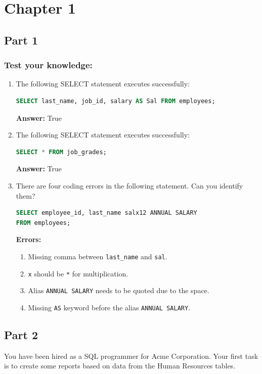 \documentclass[a4paper,12pt]{article}
\begin{document}


\newpage
\section*{Chapter 1}
\subsection*{Part 1}
\subsubsection*{Test your knowledge:}

\begin{enumerate}
    \item The following SELECT statement executes successfully: 
    \begin{lstlisting}[language=SQL]
SELECT last_name, job_id, salary AS Sal FROM employees;
    \end{lstlisting}
    \textbf{Answer:} True

    \item The following SELECT statement executes successfully:
    \begin{lstlisting}[language=SQL]
SELECT * FROM job_grades;
    \end{lstlisting}
    \textbf{Answer: }True
    
    \item There are four coding errors in the following statement. Can you identify them? 
    \begin{lstlisting}[language=SQL]
SELECT employee_id, last_name salx12 ANNUAL SALARY 
FROM employees;
    \end{lstlisting}
    \textbf{Errors:}
    \begin{enumerate}
        \item Missing comma between \texttt{last\_name} and \texttt{sal}.
        \item \texttt{x} should be \texttt{*} for multiplication.
        \item Alias \texttt{ANNUAL SALARY} needs to be quoted due to the space.
        \item Missing \texttt{AS} keyword before the alias \texttt{ANNUAL SALARY}.
    \end{enumerate}

\end{enumerate}

\subsection*{Part 2}
You have been hired as a SQL programmer for Acme Corporation. Your first task is to create some
reports based on data from the Human Resources tables.
\end{document}
